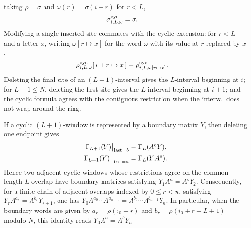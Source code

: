 \begin{remark}
    taking $\rho=\sigma$ and $\omega(r)=\sigma(i+r)$ for $r<L$,
    \begin{align}
        \sigma^{\mathrm{cyc}}_{i,L,\omega}
         & = \sigma.
        \notag
    \end{align}
    Modifying a single inserted site commutes with the cyclic extension: for $r<L$ and a
    letter $x$, writing $\omega[r\mapsto x]$ for the word $\omega$ with its
    value at $r$ replaced by $x$,
    \begin{align}
        \rho^{\mathrm{cyc}}_{i,L,\omega}[\,i+r\mapsto x\,]
         & = \rho^{\mathrm{cyc}}_{i,L,\omega[r\mapsto x]}.
        \notag
    \end{align}
    Deleting the final site of an $(L+1)$-interval gives the $L$-interval
    beginning at $i$; for $L+1\le N$, deleting the first site gives the
    $L$-interval beginning at $i+1$; and the cyclic formula agrees with the
    contiguous restriction when the interval does not wrap around the ring.
\end{remark}

\begin{lemma}
    \label{thm:cyclic_window_boundary_matrix_transport}
    \leanok
    If a cyclic $(L+1)$-window is represented by a boundary matrix $Y$, then
    deleting one endpoint gives
    \begin{align}
        \Gamma_{L+1}(Y)\big|_{\mathrm{last}=b}
         & = \Gamma_L(A^bY),
        \notag               \\
        \Gamma_{L+1}(Y)\big|_{\mathrm{first}=a}
         & = \Gamma_L(YA^a).
        \notag
    \end{align}
    Hence two adjacent cyclic windows whose restrictions agree on the common
    length-$L$ overlap have boundary matrices satisfying $Y_1A^a=A^bY_2$.
    Consequently, for a finite chain of adjacent overlaps indexed by
    $0\le r<n$, satisfying $Y_rA^{a_r}=A^{b_r}Y_{r+1}$, one has
    $Y_0A^{a_0}\cdots A^{a_{n-1}} = A^{b_0}\cdots A^{b_{n-1}}Y_n$.
    In particular, when the boundary words are given by $a_r=\rho(i_0+r)$ and
    $b_r=\rho(i_0+r+L+1)$ modulo $N$, this identity reads $Y_0A^a=A^bY_n$.
\end{lemma}

